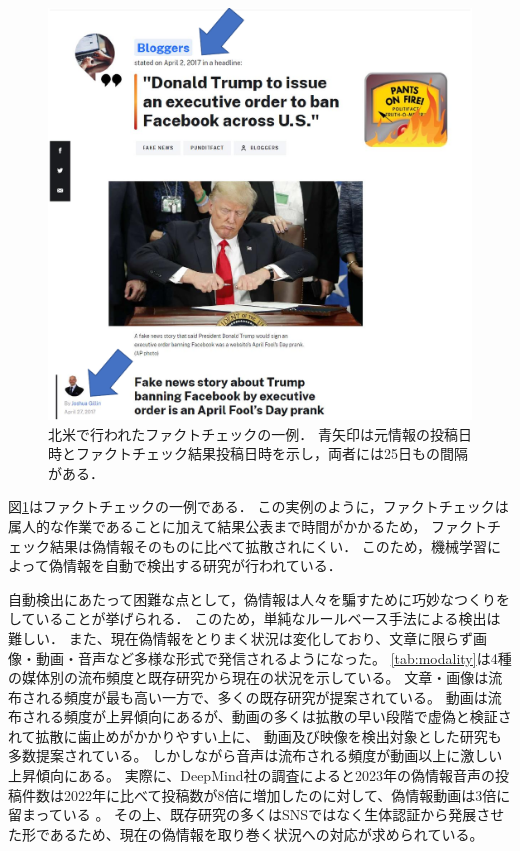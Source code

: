 \begin{figure}[p]
    \centering
    \includegraphics[width=0.8\linewidth]{figures/fact-check.pdf}
    \caption{
        北米で行われたファクトチェックの一例．
        青矢印は元情報の投稿日時とファクトチェック結果投稿日時を示し，両者には25日もの間隔がある．
        }
    \label{fig:example}
\end{figure}

図\ref{fig:example}はファクトチェックの一例である\cite{gillin_2017}．
この実例のように，ファクトチェックは属人的な作業であることに加えて結果公表まで時間がかかるため，
ファクトチェック結果は偽情報そのものに比べて拡散されにくい．
このため，機械学習によって偽情報を自動で検出する研究が行われている．

自動検出にあたって困難な点として，偽情報は人々を騙すために巧妙なつくりをしていることが挙げられる．
このため，単純なルールベース手法による検出は難しい．
また、現在偽情報をとりまく状況は変化しており、文章に限らず画像・動画・音声など多様な形式で発信されるようになった。
\cref{tab:modality}は4種の媒体別の流布頻度と既存研究から現在の状況を示している。
文章・画像は流布される頻度が最も高い一方で、多くの既存研究が提案されている。
動画は流布される頻度が上昇傾向にあるが、動画の多くは拡散の早い段階で虚偽と検証されて拡散に歯止めがかかりやすい上に、
動画及び映像を検出対象とした研究も多数提案されている。
しかしながら音声は流布される頻度が動画以上に激しい上昇傾向にある。
実際に、DeepMind社の調査によると2023年の偽情報音声の投稿件数は2022年に比べて投稿数が8倍に増加したのに対して、偽情報動画は3倍に留まっている \cite{Ulmer_Tong_2023}。
その上、既存研究の多くはSNSではなく生体認証から発展させた形であるため、現在の偽情報を取り巻く状況への対応が求められている。
% 

